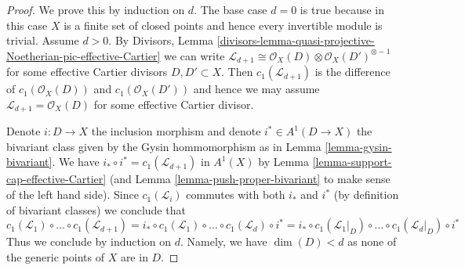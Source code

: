 \documentclass[10pt,a4paper]{amsart}
\theoremstyle{plain}
\theoremstyle{definition}
\theoremstyle{remark}
\numberwithin{equation}{subsection}
\begin{document}
\begin{proof}
We prove this by induction on $d$. The base case $d = 0$ is true because
in this case $X$ is a finite set of closed points and hence every invertible
module is trivial. Assume $d > 0$. By Divisors, Lemma
\ref{divisors-lemma-quasi-projective-Noetherian-pic-effective-Cartier}
we can write $\mathcal{L}_{d + 1} \cong \mathcal{O}_X(D) \otimes
\mathcal{O}_X(D')^{\otimes -1}$ for some effective Cartier divisors
$D, D' \subset X$. Then $c_1(\mathcal{L}_{d + 1})$ is the difference
of $c_1(\mathcal{O}_X(D))$ and $c_1(\mathcal{O}_X(D'))$ and hence
we may assume $\mathcal{L}_{d + 1} = \mathcal{O}_X(D)$ for some
effective Cartier divisor.

\medskip\noindent
Denote $i : D \to X$ the inclusion morphism and denote
$i^* \in A^1(D \to X)$ the bivariant class given by the
Gysin hommomorphism as in Lemma \ref{lemma-gysin-bivariant}.
We have $i_* \circ i^* = c_1(\mathcal{L}_{d + 1})$
in $A^1(X)$ by Lemma \ref{lemma-support-cap-effective-Cartier}
(and Lemma \ref{lemma-push-proper-bivariant}
to make sense of the left hand side).
Since $c_1(\mathcal{L}_i)$ commutes with
both $i_*$ and $i^*$ (by definition of bivariant classes)
we conclude that
$$
c_1(\mathcal{L}_1) \circ \ldots \circ c_1(\mathcal{L}_{d + 1}) =
i_* \circ c_1(\mathcal{L}_1) \circ \ldots \circ c_1(\mathcal{L}_d) \circ i^* =
i_* \circ c_1(\mathcal{L}_1|_D) \circ \ldots \circ c_1(\mathcal{L}_d|_D)
\circ i^*
$$
Thus we conclude by induction on $d$. Namely, we have $\dim(D) < d$
as none of the generic points of $X$ are in $D$.
\end{proof}
\end{document}
